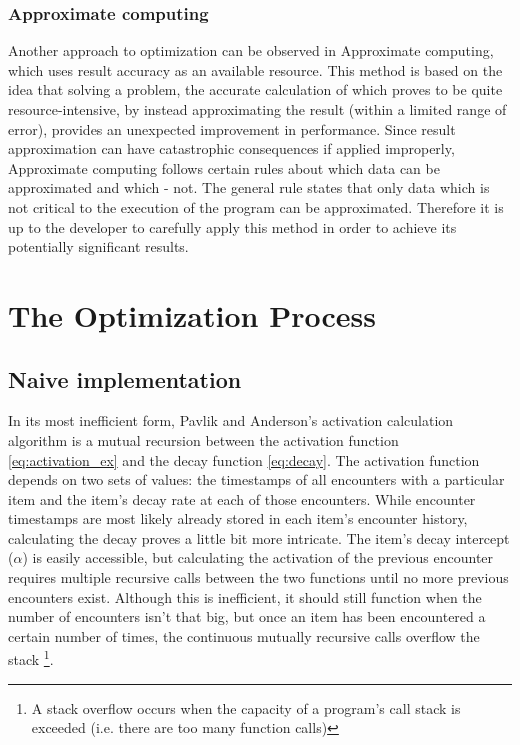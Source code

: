 \documentclass[a4paper]{report}
\begin{document}
\subsection{Approximate computing}
Another approach to optimization can be observed in Approximate computing, which uses result accuracy as an available resource. This method is based on the idea that solving a problem, the accurate calculation of which proves to be quite resource-intensive, by instead approximating the result (within a limited range of error), provides an unexpected improvement in performance. Since result approximation can have catastrophic consequences if applied improperly, Approximate computing follows certain rules about which data can be approximated and which - not. The general rule states that only data which is not critical to the execution of the program can be approximated. Therefore it is up to the developer to carefully apply this method in order to achieve its potentially significant results. \cite{approx_computing}



\chapter{The Optimization Process}
\section{Naive implementation}
In its most inefficient form, Pavlik and Anderson's activation calculation algorithm is a mutual recursion between the activation function \ref{eq:activation_ex} and the decay function \ref{eq:decay}. The activation function depends on two sets of values: the timestamps of all encounters with a particular item and the item's decay rate at each of those encounters. While encounter timestamps are most likely already stored in each item's encounter history, calculating the decay proves a little bit more intricate. The item's decay intercept ($\alpha$) is easily accessible, but calculating the activation of the previous encounter requires multiple recursive calls between the two functions until no more previous encounters exist. Although this is inefficient, it should still function when the number of encounters isn't that big, but once an item has been encountered a certain number of times, the continuous mutually recursive calls overflow the stack \footnote{A stack overflow occurs when the capacity of a program's call stack is exceeded (i.e. there are too many function calls)}.
\end{document}
